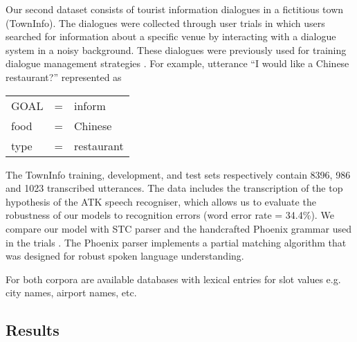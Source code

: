 \documentclass{article}
\begin{document}
Our second dataset consists of tourist information dialogues in a fictitious
town (TownInfo). The dialogues were collected through user
trials in which users searched for information about a specific venue
by interacting with a dialogue system in a noisy background. These
dialogues were previously used for training dialogue management
strategies \cite{williams07,thomson08}. 
For example, utterance  ``I would like a Chinese restaurant?'' represented as

\vspace{.15cm}
\begin{tabular}{lll}
  GOAL       & = & inform \\
  food       & = & Chinese \\
  type       & = & restaurant \\
\end{tabular} 
\vspace{.15cm}

The TownInfo training, development, and test sets respectively contain
8396, 986 and 1023 transcribed utterances.  The data includes the transcription of the top hypothesis of the ATK speech recogniser, which allows us to evaluate the robustness of our models to recognition
errors (word error rate = 34.4\%). 
We compare our model with STC parser \cite{mairesse09} and the handcrafted Phoenix grammar \cite{ward91} used in the trials \cite{williams07,thomson08}. The Phoenix parser implements a partial matching algorithm that was designed for robust spoken language understanding.

For both corpora are available databases with lexical entries for slot values e.g. city names, airport names, etc. 

\subsection{Results}
\end{document}
